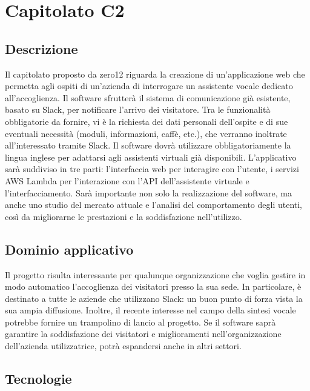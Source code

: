 \newpage
\section{Capitolato C2}

\subsection{Descrizione}

Il capitolato proposto da zero12 riguarda la creazione di un'applicazione
web che permetta agli ospiti di un'azienda di interrogare un assistente
vocale dedicato all'accoglienza. Il software sfrutterà il sistema
di comunicazione già esistente, basato su Slack, per notificare l'arrivo dei visitatore. Tra le funzionalità obbligatorie da fornire,
vi è la richiesta dei dati personali dell'ospite e di sue eventuali
necessità (moduli, informazioni, caffè, etc.), che verranno inoltrate
all'interessato tramite Slack. Il software dovrà utilizzare obbligatoriamente
la lingua inglese per adattarsi agli assistenti virtuali già disponibili.
L'applicativo sarà suddiviso in tre parti: l'interfaccia web per interagire
con l'utente, i servizi AWS Lambda per l'interazione con l'API dell'assistente
virtuale e l'interfacciamento. Sarà importante non solo la realizzazione
del software, ma anche uno studio del mercato attuale e l'analisi
del comportamento degli utenti, così da migliorarne le prestazioni
e la soddisfazione nell'utilizzo.

\subsection{Dominio applicativo}

Il progetto risulta interessante per qualunque organizzazione che voglia
gestire in modo automatico l'accoglienza dei visitatori presso la sua sede. In particolare,
è destinato a tutte le aziende che utilizzano Slack: un buon punto di forza vista
la sua ampia diffusione. Inoltre, il recente interesse nel campo della
sintesi vocale potrebbe fornire un trampolino di lancio al progetto.
Se il software saprà garantire la soddisfazione dei visitatori e miglioramenti
nell'organizzazione dell'azienda utilizzatrice, potrà espandersi
anche in altri settori.

\subsection{Tecnologie}

